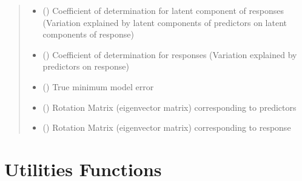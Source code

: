 \documentclass[letterpaper,10pt,english]{sphinxmanual}
\begin{document}
\begin{fulllineitems}
\begin{quote}
\begin{description}
\begin{itemize}
\item {} 
 () \textendash{} Coefficient of determination for latent component of responses (Variation explained by latent components of predictors on latent components of response)

\item {} 
 () \textendash{} Coefficient of determination for responses (Variation explained by predictors on response)

\item {} 
 () \textendash{} True minimum model error

\item {} 
 () \textendash{} Rotation Matrix (eigenvector matrix) corresponding to predictors

\item {} 
 () \textendash{} Rotation Matrix (eigenvector matrix) corresponding to response

\end{itemize}

\end{description}\end{quote}

\end{fulllineitems}


\begin{fulllineitems}
\label{\detokenize{Classes:pysimrel.Data}}
\end{fulllineitems}



\section{Utilities Functions}
\label{\detokenize{Utilities:module-pysimrel.utilities}}\label{\detokenize{Utilities:utilities-functions}}\label{\detokenize{Utilities::doc}}
\end{document}
